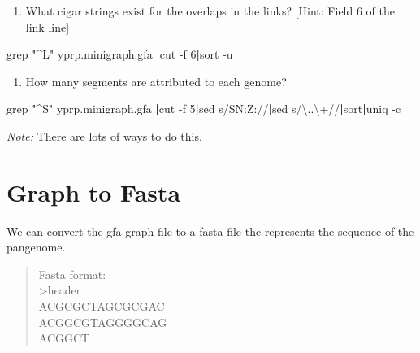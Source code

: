 \documentclass[
]{book}
\newenvironment{Shaded}{\begin{snugshade}}{\end{snugshade}}
\newcommand{\AttributeTok}[1]{\textcolor[rgb]{0.77,0.63,0.00}{#1}}
\newcommand{\FunctionTok}[1]{\textcolor[rgb]{0.00,0.00,0.00}{#1}}
\newcommand{\KeywordTok}[1]{\textcolor[rgb]{0.13,0.29,0.53}{\textbf{#1}}}
\newcommand{\NormalTok}[1]{#1}
\newcommand{\StringTok}[1]{\textcolor[rgb]{0.31,0.60,0.02}{#1}}
\providecommand{\tightlist}{%
  \setlength{\itemsep}{0pt}\setlength{\parskip}{0pt}}
\begin{document}
\begin{enumerate}
\def\labelenumi{\arabic{enumi}.}
\setcounter{enumi}{2}
\tightlist
\item
  What cigar strings exist for the overlaps in the links? {[}Hint: Field 6 of the link line{]}
\end{enumerate}

\begin{Shaded}
\begin{Highlighting}[]
\FunctionTok{grep} \StringTok{"\^{}L"}\NormalTok{ yprp.minigraph.gfa }\KeywordTok{|}\FunctionTok{cut} \AttributeTok{{-}f}\NormalTok{ 6}\KeywordTok{|}\FunctionTok{sort} \AttributeTok{{-}u}
\end{Highlighting}
\end{Shaded}

\begin{enumerate}
\def\labelenumi{\arabic{enumi}.}
\setcounter{enumi}{3}
\tightlist
\item
  How many segments are attributed to each genome?
\end{enumerate}

\begin{Shaded}
\begin{Highlighting}[]
\FunctionTok{grep} \StringTok{"\^{}S"}\NormalTok{ yprp.minigraph.gfa }\KeywordTok{|}\FunctionTok{cut} \AttributeTok{{-}f}\NormalTok{ 5}\KeywordTok{|}\FunctionTok{sed} \StringTok{\textquotesingle{}s/SN:Z://\textquotesingle{}}\KeywordTok{|}\FunctionTok{sed} \StringTok{\textquotesingle{}s/\textbackslash{}..\textbackslash{}+//\textquotesingle{}}\KeywordTok{|}\FunctionTok{sort}\KeywordTok{|}\FunctionTok{uniq} \AttributeTok{{-}c}
\end{Highlighting}
\end{Shaded}

\emph{Note:} There are lots of ways to do this.

\hypertarget{graph-to-fasta}{%
\section{Graph to Fasta}\label{graph-to-fasta}}

We can convert the gfa graph file to a fasta file the represents the sequence of the pangenome.

\begin{quote}
Fasta format:\\
\textgreater header\\
ACGCGCTAGCGCGAC\\
ACGGCGTAGGGGCAG\\
ACGGCT
\end{quote}
\end{document}

